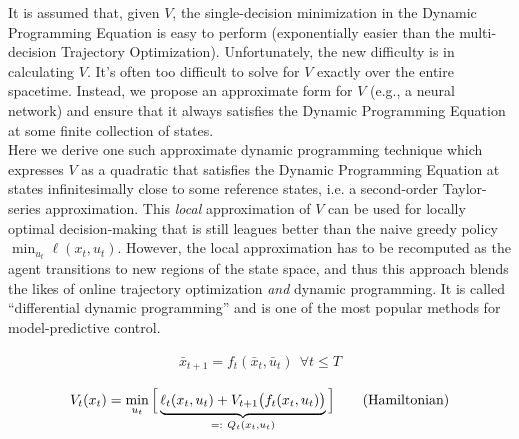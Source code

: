 \documentclass{article}
\begin{document}
It is assumed that, given $V$, the single-decision minimization in the Dynamic Programming Equation is easy to perform (exponentially easier than the multi-decision Trajectory Optimization). Unfortunately, the new difficulty is in calculating $V$. It's often too difficult to solve for $V$ exactly over the entire spacetime. Instead, we propose an approximate form for $V$ (e.g., a neural network) and ensure that it always satisfies the Dynamic Programming Equation at some finite collection of states.\\

Here we derive one such approximate dynamic programming technique which expresses $V$ as a quadratic that satisfies the Dynamic Programming Equation at states infinitesimally close to some reference states, i.e. a second-order Taylor-series approximation. This \textit{local} approximation of $V$ can be used for locally optimal decision-making that is still leagues better than the naive greedy policy $\min_{u_t}\ell(x_t,u_t)$. However, the local approximation has to be recomputed as the agent transitions to new regions of the state space, and thus this approach blends the likes of online trajectory optimization \textit{and} dynamic programming. It is called ``differential dynamic programming'' and is one of the most popular methods for model-predictive control.

\begin{gather*}
\bar{x}_{t+1} = f_t(\bar{x}_t,\bar{u}_t)\ \ \forall t \leq T \tag{Forward Simulation}
\end{gather*}

\begin{equation*}
V_t(x_t) = \min_{u_t} \Big{[}\underbrace{\ell_t(x_t,u_t) + V_{t+1}\big{(}f_t(x_t,u_t)\big{)}}_{=:\ Q_t(x_t,u_t)}\Big{]} \tag{Hamiltonian}
\end{equation*}

\clearpage
\end{document}
